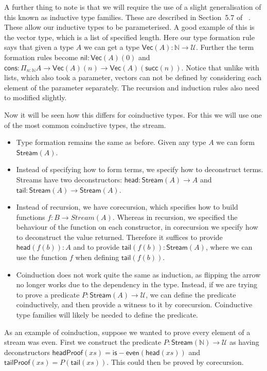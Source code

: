 \documentclass{article}
\theoremstyle{definition}
\theoremstyle{remark}
\begin{document}
A further thing to note is that we will require the use of a slight generalisation of this known as inductive type families. These are described in Section~5.7 of ~\cite{hottbook}. These allow our inductive types to be parameterised. A good example of this is the vector type, which is a list of specified length. Here our type formation rule says that given a type \(A\) we can get a type \(\mathsf{Vec}(A) : \mathbb{N} \to \mathcal{U}\). Further the term formation rules become \(\mathsf{nil} : \mathsf{Vec}(A)(0)\) and \(\mathsf{cons} : \Pi_{n : \mathbb{N}} A \to \mathsf{Vec}(A)(n) \to \mathsf{Vec}(A)(\mathsf{succ}(n))\). Notice that unlike with lists, which also took a parameter, vectors can not be defined by considering each element of the parameter separately. The recursion and induction rules also need to modified slightly.

Now it will be seen how this differs for coinductive types. For this we will use one of the most common coinductive types, the stream.

\begin{itemize}
\item Type formation remains the same as before. Given any type \(A\) we can form \(\mathsf{Stream}(A)\).
\item Instead of specifying how to form terms, we specify how to deconstruct terms. Streams have two deconstructors: \(\mathsf{head} : \mathsf{Stream}(A) \to A\) and \(\mathsf{tail} : \mathsf{Stream}(A) \to \mathsf{Stream}(A)\).
\item Instead of recursion, we have corecursion, which specifies how to build functions \(f : B \to Stream(A)\). Whereas in recursion, we specified the behaviour of the function on each constructor, in corecursion we specify how to deconstruct the value returned. Therefore it suffices to provide \(\mathsf{head}(f(b)) : A\) and to provide \(\mathsf{tail}(f(b)) : \mathsf{Stream}(A)\), where we can use the function \(f\) when defining \(\mathsf{tail}(f(b))\).
\item Coinduction does not work quite the same as induction, as flipping the arrow no longer works due to the dependency in the type. Instead, if we are trying to prove a predicate \(P : \mathsf{Stream}(A) \to \mathcal{U}\), we can define the predicate coinductively, and then provide a witness to it by corecursion. Coinductive type families will likely be needed to define the predicate.
\end{itemize}

As an example of coinduction, suppose we wanted to prove every element of a stream was even. First we construct the predicate \(P : \mathsf{Stream}(\mathbb{N}) \to \mathcal{U}\) as having deconstructors \(\mathsf{headProof}(xs) = \mathsf{is-even}(\mathsf{head}(xs))\) and \(\mathsf{tailProof}(xs) = P(\mathsf{tail}(xs))\). This could then be proved by corecursion.
\end{document}
